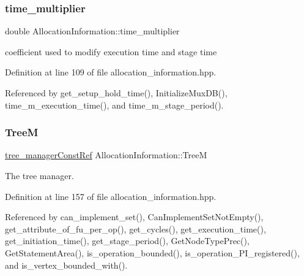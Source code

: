 \subsubsection{\texorpdfstring{time\+\_\+multiplier}{time\_multiplier}}
{\footnotesize\ttfamily double Allocation\+Information\+::time\+\_\+multiplier\hspace{0.3cm}{\ttfamily [private]}}



coefficient used to modify execution time and stage time 



Definition at line 109 of file allocation\+\_\+information.\+hpp.



Referenced by get\+\_\+setup\+\_\+hold\+\_\+time(), Initialize\+Mux\+D\+B(), time\+\_\+m\+\_\+execution\+\_\+time(), and time\+\_\+m\+\_\+stage\+\_\+period().

\mbox{\label{classAllocationInformation_a6a3e2584d17181a42ac7dcd25bebe601}} 
\subsubsection{\texorpdfstring{TreeM}{TreeM}}
{\footnotesize\ttfamily \hyperlink{tree__manager_8hpp_a792e3f1f892d7d997a8d8a4a12e39346}{tree\+\_\+manager\+Const\+Ref} Allocation\+Information\+::\+TreeM\hspace{0.3cm}{\ttfamily [private]}}



The tree manager. 



Definition at line 157 of file allocation\+\_\+information.\+hpp.



Referenced by can\+\_\+implement\+\_\+set(), Can\+Implement\+Set\+Not\+Empty(), get\+\_\+attribute\+\_\+of\+\_\+fu\+\_\+per\+\_\+op(), get\+\_\+cycles(), get\+\_\+execution\+\_\+time(), get\+\_\+initiation\+\_\+time(), get\+\_\+stage\+\_\+period(), Get\+Node\+Type\+Prec(), Get\+Statement\+Area(), is\+\_\+operation\+\_\+bounded(), is\+\_\+operation\+\_\+\+P\+I\+\_\+registered(), and is\+\_\+vertex\+\_\+bounded\+\_\+with().

\mbox{\label{classAllocationInformation_ae17eab4836b6c9e353838603563b2be9}} 
